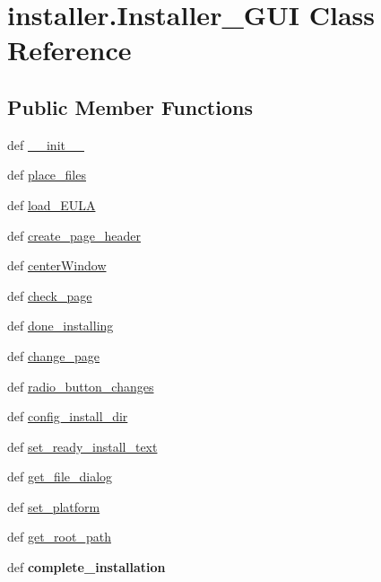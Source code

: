 \hypertarget{classinstaller_1_1Installer__GUI}{\section{installer.\-Installer\-\_\-\-G\-U\-I Class Reference}
\label{classinstaller_1_1Installer__GUI}
}
\subsection*{Public Member Functions}
\begin{DoxyCompactItemize}
\item 
def \hyperlink{classinstaller_1_1Installer__GUI_ac1756275baf0e3624c01d378ba1e442f}{\-\_\-\-\_\-init\-\_\-\-\_\-}
\item 
def \hyperlink{classinstaller_1_1Installer__GUI_a7cf59367aa113d52dacd28483db96bb5}{place\-\_\-files}
\item 
def \hyperlink{classinstaller_1_1Installer__GUI_a115ff5222455a892406980950bbb9340}{load\-\_\-\-E\-U\-L\-A}
\item 
def \hyperlink{classinstaller_1_1Installer__GUI_acc87ce92d14c4ec58746ec86ac555cf7}{create\-\_\-page\-\_\-header}
\item 
def \hyperlink{classinstaller_1_1Installer__GUI_a8858becb4f33cfb13a4f8ddc83fc4602}{center\-Window}
\item 
def \hyperlink{classinstaller_1_1Installer__GUI_ac74441870d6828e821c42431e42d2cfe}{check\-\_\-page}
\item 
def \hyperlink{classinstaller_1_1Installer__GUI_afb24e61f03f9f226b1d62e4fc6f8b6ac}{done\-\_\-installing}
\item 
def \hyperlink{classinstaller_1_1Installer__GUI_aa9c0f534bb73c31b710742ca41421b90}{change\-\_\-page}
\item 
def \hyperlink{classinstaller_1_1Installer__GUI_ac3307e582943a4a71fc5aed7a1698165}{radio\-\_\-button\-\_\-changes}
\item 
def \hyperlink{classinstaller_1_1Installer__GUI_aeeeed451119e6c4509279acdd39a7a7f}{config\-\_\-install\-\_\-dir}
\item 
def \hyperlink{classinstaller_1_1Installer__GUI_ab8681807914ab6efadb44b00aeaa8423}{set\-\_\-ready\-\_\-install\-\_\-text}
\item 
def \hyperlink{classinstaller_1_1Installer__GUI_ac23c465d1b7b99cb3bc12b9c3cafaada}{get\-\_\-file\-\_\-dialog}
\item 
def \hyperlink{classinstaller_1_1Installer__GUI_a0b6691062ff58c1c496aec84f8744fb5}{set\-\_\-platform}
\item 
def \hyperlink{classinstaller_1_1Installer__GUI_a73d9c79cd30262affbfa0382eda2a72e}{get\-\_\-root\-\_\-path}
\item 
\hypertarget{classinstaller_1_1Installer__GUI_a1ae1ba17f32fc652e5ef33abc51a8b68}{def {\bfseries complete\-\_\-installation}}\label{classinstaller_1_1Installer__GUI_a1ae1ba17f32fc652e5ef33abc51a8b68}


\end{DoxyCompactItemize}
